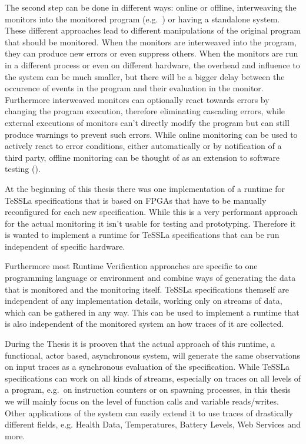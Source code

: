 The second step can be done in different ways: online or offline, interweaving the monitors into the monitored program (e.g.~\cite{Havelund2008}) or having a standalone system.
These different approaches lead to different manipulations of the original program that should be monitored.
When the monitors are interweaved into the program, they can produce new errors or even suppress others.
When the monitors are run in a different process or even on different hardware, the overhead and influence to the system can be much smaller,
but there will be a bigger delay between the occurence of events in the program and their evaluation in the monitor.
Furthermore interweaved monitors can optionally react towards errors by changing the program execution, therefore eliminating cascading errors,
while external executions of monitors can't directly modify the program but can still produce warnings to prevent such errors.
While online monitoring can be used to actively react to error conditions, either automatically or by notification of a third party,
offline monitoring can be thought of as an extension to software testing (\cite{DAngelo2005}).

At the beginning of this thesis there was one implementation of a runtime for TeSSLa specifications that is based on FPGAs that have to be manually reconfigured for each new specification.
While this is a very performant approach for the actual monitoring it isn't usable for testing and prototyping.
Therefore it is wanted to implement a runtime for TeSSLa specifications that can be run independent of specific hardware.

Furthermore most Runtime Verification approaches are specific to one programming language or environment and combine ways of generating the data that is monitored and the monitoring itself.
TeSSLa specifications themself are independent of any implementation details, working only on streams of data, which can be gathered in any way.
This can be used to implement a runtime that is also independent of the monitored system an how traces of it are collected.

During the Thesis it is prooven that the actual approach of this runtime, a functional, actor based, asynchronous system,
will generate the same observations on input traces as a synchronous evaluation of the specification.
While TeSSLa specifications can work on all kinds of streams, especially on traces on all levels of a program, e.g.\
on instruction counters or on spawning processes, in this thesis we will mainly focus on the level of function calls and variable reads/writes.
Other applications of the system can easily extend it to use traces of drastically different fields, e.g. Health Data, Temperatures, Battery Levels, Web Services and more.

